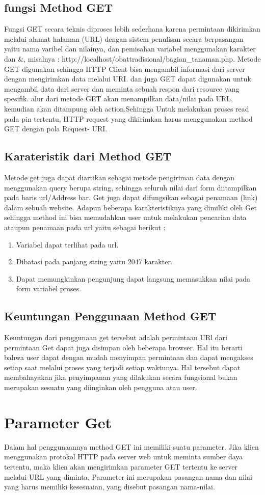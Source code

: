 \subsection{fungsi Method GET}
Fungsi GET secara teknis diproses lebih sederhana karena permintaan dikirimkan melalui alamat halaman (URL) dengan sistem 
penulisan secara berpasangan yaitu nama varibel dan nilainya, dan pemisahan variabel menggunakan karakter dan &, misalnya :
http://localhost/obattradisional/bagian_tanaman.php. Metode GET digunakan sehingga HTTP Client bisa mengambil informasi dari 
server dengan mengirimkan data melalui URI.
dan juga GET dapat digunakan untuk mengambil data dari server dan meminta sebuah respon dari resource yang spesifik.  alur dari 
metode GET akan menampilkan data/nilai pada URL, kemudian akan ditampung oleh action.Sehingga Untuk melakukan proses read pada 
pin tertentu, HTTP request yang dikirimkan harus menggunakan method GET dengan pola Request- URI.

\subsection{Karateristik dari Method GET}
Metode get juga dapat diartikan sebagai metode pengiriman data dengan menggunakan query berupa string, sehingga seluruh nilai dari form 
diitampilkan pada baris url/Address bar. Get juga dapat difungsikan sebagai penamaan (link) dalam sebuah website. Adapun beberapa 
karakteristiknya yang dimiliki oleh Get sehingga method ini bisa memudahkan user untuk melakukan pencarian data ataupun penamaan pada 
url yaitu sebagai berikut :
\begin{enumerate}
\item Variabel dapat terlihat pada url.
\item Dibatasi pada panjang string yaitu 2047 karakter.
\item Dapat memungkinkan pengunjung dapat langsung memasukkan nilai pada form variabel proses.
\end{enumerate}

\subsection{Keuntungan Penggunaan Method GET}
Keuntungan dari penggunaan get tersebut adalah permintaan URl dari permintaan Get dapat juga disimpan oleh beberapa browser.
Hal itu berarti bahwa user dapat dengan mudah menyimpan permintaan dan dapat mengakses setiap saat melalui proses yang terjadi setiap 
waktunya. Hal tersebut dapat membahayakan jika penyimpanan yang dilakukan secara fungsional bukan merupakan sesuatu yang diinginkan oleh 
pengguna atau user.


\section{Parameter Get}
Dalam hal penggunaannya method GET ini memiliki suatu parameter. Jika klien menggunakan protokol HTTP pada server web untuk meminta sumber daya tertentu, maka klien akan mengirimkan parameter GET tertentu ke server melalui URL yang diminta. Parameter ini merupakan pasangan nama dan nilai yang harus memiliki kesesuaian, yang disebut pasangan nama-nilai. 
